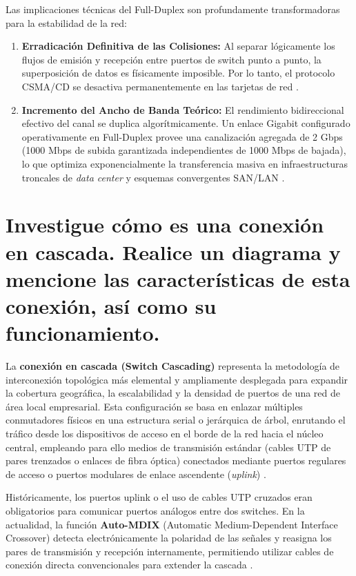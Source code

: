 \documentclass[a4paper,12pt]{article}
\begin{document}
Las implicaciones técnicas del Full-Duplex son profundamente transformadoras para la estabilidad de la red:
\begin{enumerate}
    \item \textbf{Erradicación Definitiva de las Colisiones:} Al separar lógicamente los flujos de emisión y recepción entre puertos de switch punto a punto, la superposición de datos es físicamente imposible. Por lo tanto, el protocolo CSMA/CD se desactiva permanentemente en las tarjetas de red \cite{tanenbaum2021}.
    \item \textbf{Incremento del Ancho de Banda Teórico:} El rendimiento bidireccional efectivo del canal se duplica algorítmicamente. Un enlace Gigabit configurado operativamente en Full-Duplex provee una canalización agregada de 2 Gbps (1000 Mbps de subida garantizada independientes de 1000 Mbps de bajada), lo que optimiza exponencialmente la transferencia masiva en infraestructuras troncales de \textit{data center} y esquemas convergentes SAN/LAN \cite{stallings2014}.
\end{enumerate}

\newpage

\section{Investigue cómo es una conexión en cascada. Realice un diagrama y mencione las características de esta conexión, así como su funcionamiento.}

La \textbf{conexión en cascada (Switch Cascading)} representa la metodología de interconexión topológica más elemental y ampliamente desplegada para expandir la cobertura geográfica, la escalabilidad y la densidad de puertos de una red de área local empresarial. Esta configuración se basa en enlazar múltiples conmutadores físicos en una estructura serial o jerárquica de árbol, enrutando el tráfico desde los dispositivos de acceso en el borde de la red hacia el núcleo central, empleando para ello medios de transmisión estándar (cables UTP de pares trenzados o enlaces de fibra óptica) conectados mediante puertos regulares de acceso o puertos modulares de enlace ascendente (\textit{uplink}) \cite{tanenbaum2021}.

Históricamente, los puertos uplink o el uso de cables UTP cruzados eran obligatorios para comunicar puertos análogos entre dos switches. En la actualidad, la función \textbf{Auto-MDIX} (Automatic Medium-Dependent Interface Crossover) detecta electrónicamente la polaridad de las señales y reasigna los pares de transmisión y recepción internamente, permitiendo utilizar cables de conexión directa convencionales para extender la cascada \cite{kurose2017}.
\end{document}

